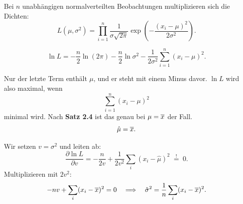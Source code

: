 \begin{merksatz}
Bei $n$ unabhängigen normalverteilten Beobachtungen multiplizieren sich die Dichten:
\[ L(\mu,\sigma^2) = \prod_{i=1}^n \frac{1}{\sigma\sqrt{2\pi}}\exp\!\left(-\frac{(x_i-\mu)^2}{2\sigma^2}\right) . \]

\[ \ln L = -\frac{n}{2}\ln(2\pi) - \frac{n}{2}\ln\sigma^2 - \frac{1}{2\sigma^2}\sum_{i=1}^n (x_i-\mu)^2 . \]

Nur der letzte Term enthält $\mu$, und er steht mit einem Minus davor. $\ln L$ wird also maximal, wenn
\[ \sum_{i=1}^n (x_i - \mu)^2 \]
minimal wird. Nach \textbf{Satz 2.4} ist das genau bei $\mu = \overline{x}$ der Fall.
\[ \hat\mu = \overline{x} . \]

\begin{center}
\begin{minipage}{0.88\textwidth}
\end{minipage}
\end{center}

Wir setzen $v = \sigma^2$ und leiten ab:
\[ \frac{\partial \ln L}{\partial v} = -\frac{n}{2v} + \frac{1}{2v^2}\sum_i (x_i-\hat\mu)^2 \;\stackrel{!}{=}\; 0 . \]
Multiplizieren mit $2v^2$:
\[ -nv + \sum_i (x_i-\overline{x})^2 = 0 \quad\Longrightarrow\quad \hat\sigma^2 = \frac{1}{n}\sum_i (x_i-\overline{x})^2 . \]
\end{merksatz}

